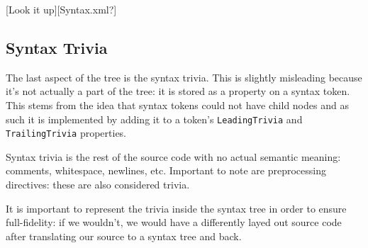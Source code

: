 [Look it up][Syntax.xml?]

\subsection{Syntax Trivia}
\label{sec:syntax-trivia}

The last aspect of the tree is the syntax trivia. This is slightly misleading because it's not actually a part of the tree: it is stored as a property on a syntax token. This stems from the idea that syntax tokens could not have child nodes and as such it is implemented by adding it to a token's \texttt{LeadingTrivia} and \texttt{TrailingTrivia} properties. 

Syntax trivia is the rest of the source code with no actual semantic meaning: comments, whitespace, newlines, etc. Important to note are preprocessing directives: these are also considered trivia.

It is important to represent the trivia inside the syntax tree in order to ensure full-fidelity: if we wouldn't, we would have a differently layed out source code after translating our source to a syntax tree and back.




